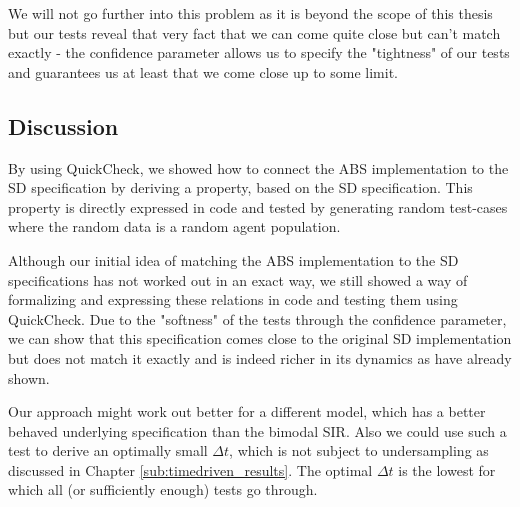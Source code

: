 We will not go further into this problem as it is beyond the scope of this thesis but our tests reveal that very fact that we can come quite close but can't match exactly - the confidence parameter allows us to specify the "tightness" of our tests and guarantees us at least that we come close up to some limit.


\subsection{Discussion}
By using QuickCheck, we showed how to connect the ABS implementation to the SD specification by deriving a property, based on the SD specification. This property is directly expressed in code and tested by generating random test-cases where the random data is a random agent population. 

Although our initial idea of matching the ABS implementation to the SD specifications has not worked out in an exact way, we still showed a way of formalizing and expressing these relations in code and testing them using QuickCheck. Due to the "softness" of the tests through the confidence parameter, we can show that this specification comes close to the original SD implementation but does not match it exactly and is indeed richer in its dynamics as \cite{macal_agent-based_2010, figueredo_comparing_2014} have already shown. 

Our approach might work out better for a different model, which has a better behaved underlying specification than the bimodal SIR. Also we could use such a test to derive an optimally small $\Delta t$, which is not subject to undersampling as discussed in Chapter \ref{sub:timedriven_results}. The optimal $\Delta t$ is the lowest for which all (or sufficiently enough) tests go through. %


